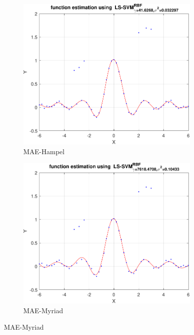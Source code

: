 \documentclass{article}
\begin{document}
\begin{figure}[h]
\begin{subfigure}[b]{0.22\textwidth}
                 \includegraphics[width=\textwidth]{Assignment 2/figures/1_4/robust_mae_whampel.pdf}
                 \caption{MAE-Hampel}
                 \label{fig:robust_regression_hampel}
             \end{subfigure}
             \hfill
             \begin{subfigure}[b]{0.22\textwidth}
                 \centering
                 \includegraphics[width=\textwidth]{Assignment 2/figures/1_4/robust_mae_wmyriad.pdf}
                 \caption{MAE-Myriad}

\end{subfigure}
\end{figure}
\end{document}
